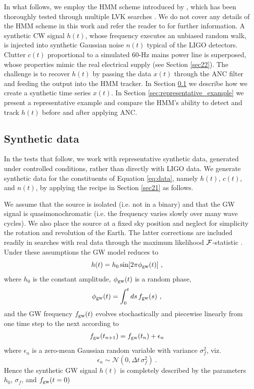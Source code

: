 \documentclass[pra,superscriptaddress,reprint,amsmath,amssymb,nofootinbib]{revtex4-2}
\begin{document}
In what follows, we employ the HMM scheme introduced by \citet{Suvorova2016PhRv}, which has been thoroughly tested through multiple LVK searches \cite{Piccinni2022,Riles2023,Wette2023}. We do not cover any details of the HMM scheme in this work and refer the reader to \citet{Suvorova2016PhRv} for further information. A synthetic CW signal $h(t)$, whose frequency executes an unbiased random walk, is injected into synthetic Gaussian noise $n(t)$ typical of the LIGO detectors. Clutter $c(t)$ proportional to a simulated 60-Hz mains power line is superposed, whose properties mimic the real electrical supply (see Section \ref{sec22}). The challenge is to recover $h(t)$ by passing the data $x(t)$ through the ANC filter and feeding the output into the HMM tracker. In Section \ref{sec:creating_data} we describe how we create a synthetic time series $x(t)$. In Section \ref{sec:representative_example} we present a representative example and compare the HMM's ability to detect and track $h(t)$ before and after applying ANC. 

\subsection{Synthetic data} \label{sec:creating_data}
In the tests that follow, we work with representative synthetic data, generated under controlled conditions, rather than directly with LIGO data. We generate synthetic data for the constituents of Equation \eqref{eq:data}, namely $h(t)$, $c(t)$, and $n(t)$, by applying the recipe in Section \ref{sec21} as follows. \newline 

We assume that the source is isolated (i.e. not in a binary) and that the GW signal is quasimonochromatic (i.e. the frequency varies slowly over many wave cycles). We also place the source at a fixed sky position and neglect for simplicity the rotation and revolution of the Earth. The latter corrections are included readily in searches with real data through the maximum likelihood ${\cal F}$-statistic \citep{Jaranowski1998}. Under these assumptions the GW model reduces to 
\begin{equation}
	h(t) = h_0\sin[2\pi \phi_{\rm gw}(t)] \ , 
\end{equation}
where $h_0$ is the constant amplitude, $\phi_{\rm gw}(t)$ is a random phase,
\begin{equation}
	\phi_{\rm gw}(t) = \int_{0}^{t} ds \, f_{\rm gw}(s)  \ ,
\end{equation}
and the GW frequency $f_{\rm gw}(t)$ evolves stochastically and piecewise linearly from one time step to the next according to
\begin{eqnarray}
	f_{\rm gw}(t_{n+1}) = f_{\rm gw}(t_n) + \epsilon_n 
\end{eqnarray}
where $\epsilon_n$ is a zero-mean Gaussian random variable with variance $\sigma_f^2$, viz.
\begin{equation}
	\epsilon_n \sim \mathcal{N}(0, \Delta t  \, \sigma_f^2) \ . \label{eq:gwfreqnoise}
\end{equation}
Hence the synthetic GW signal $h(t)$ is completely described by the parameters $h_0$, $\sigma_f$, and $f_{\rm gw}(t=0)$ \newline 
\end{document}
